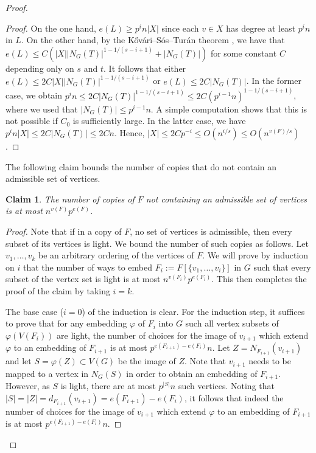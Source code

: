 \documentclass[12pt]{article}
\newtheorem{claim}[theorem]{Claim}
\begin{document}
\begin{proof}
\begin{proof}
            On the one hand, $e(L) \geq p^i n|X|$ since each $v\in X$ has degree at least $p^i n$ in $L$. On the other hand, by the K\H ov\'ari--S\'os--Tur\'an theorem \cite{KST54}, we have that $e(L) \leq C(|X||N_G(T)|^{1-1/(s-i+1)}+|N_G(T)|)$ for some constant $C$ depending only on $s$ and $t$. It follows that either $e(L)\leq 2C|X||N_G(T)|^{1-1/(s-i+1)}$ or $e(L)\leq 2C|N_G(T)|$. In the former case, we obtain $p^in\leq 2C|N_G(T)|^{1-1/(s-i+1)}\leq 2C(p^{i-1}n)^{1-1/(s-i+1)}$, where we used that $|N_G(T)|\leq p^{i-1}n$. A simple computation shows that this is not possible if $C_0$ is sufficiently large. In the latter case, we have $p^i n|X|\leq 2C|N_G(T)|\leq 2Cn$. Hence, $|X|\leq 2Cp^{-i}\leq O(n^{i/s})\leq O(n^{v(F)/s})$. 
        \end{proof}

        The following claim bounds the number of copies that do not contain an admissible set of vertices.

         \begin{claim} \label{claim:no admissible}
             The number of copies of $F$ not containing an admissible set of vertices is at most $n^{v(F)}p^{e(F)}$.
         \end{claim}

        \begin{proof}
        Note that if in a copy of $F$, no set of vertices is admissible, then every subset of its vertices is light. We bound the number of such copies as follows. Let $v_1,\dots,v_k$ be an arbitrary ordering of the vertices of $F$. We will prove by induction on $i$ that the number of ways to embed $F_i:=F[\{v_1,\dots,v_i\}]$ in $G$ such that every subset of the vertex set is light is at most $n^{v(F_i)}p^{e(F_i)}$. This then completes the proof of the claim by taking $i=k$.

        The base case ($i=0$) of the induction is clear. For the induction step, it suffices to prove that for any embedding $\varphi$ of $F_i$ into $G$ such all vertex subsets of $\varphi(V(F_i))$ are light, the number of choices for the image of $v_{i+1}$ which extend $\varphi$ to an embedding of $F_{i+1}$ is at most $p^{e(F_{i+1})-e(F_i)}n$. Let $Z=N_{F_{i+1}}(v_{i+1})$ and let $S = \varphi(Z)\subset V(G)$ be the image of $Z$. Note that $v_{i+1}$ needs to be mapped to a vertex in $N_G(S)$ in order to obtain an embedding of $F_{i+1}$. However, as $S$ is light, there are at most $p^{|S|}n$ such vertices. Noting that $|S|=|Z|=d_{F_{i+1}}(v_{i+1})=e(F_{i+1})-e(F_i)$, it follows that indeed the number of choices for the image of $v_{i+1}$ which extend $\varphi$ to an embedding of $F_{i+1}$ is at most $p^{e(F_{i+1})-e(F_i)}n$.
        \end{proof}


\end{proof}
\end{document}
